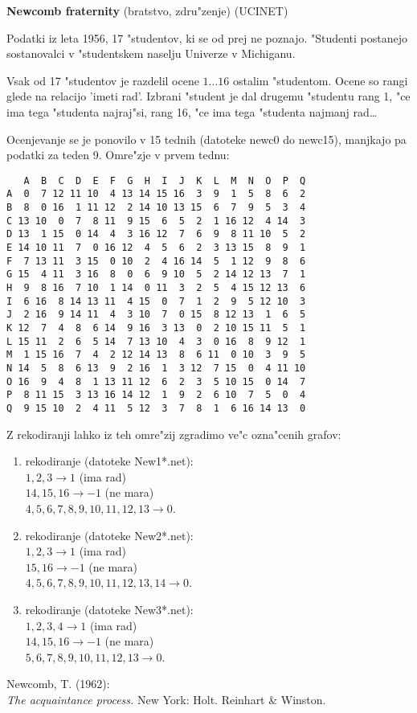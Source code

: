 \documentclass[12pt,a4paper]{article}
\begin{document}
\pagestyle{empty}
{\bf Newcomb fraternity} (bratstvo, zdru"zenje) (UCINET)

Podatki iz leta 1956, 17 "studentov, ki se od prej ne poznajo.
"Studenti postanejo sostanovalci v "studentskem naselju Univerze v 
Michiganu.

Vsak od 17 "studentov je razdelil ocene $1 \ldots 16$ 
ostalim "studentom. Ocene so rangi glede na relacijo 'imeti rad'.
Izbrani "student je dal drugemu "studentu rang 1, 
"ce ima tega "studenta najraj"si, rang 16,
"ce ima tega "studenta  najmanj rad\ldots

Ocenjevanje se je ponovilo v 15 tednih (datoteke newc0 do newc15),
manjkajo pa podatki za teden 9.
Omre"zje v prvem tednu:
\begin{small}
\begin{verbatim}
   A  B  C  D  E  F  G  H  I  J  K  L  M  N  O  P  Q
A  0  7 12 11 10  4 13 14 15 16  3  9  1  5  8  6  2
B  8  0 16  1 11 12  2 14 10 13 15  6  7  9  5  3  4
C 13 10  0  7  8 11  9 15  6  5  2  1 16 12  4 14  3
D 13  1 15  0 14  4  3 16 12  7  6  9  8 11 10  5  2
E 14 10 11  7  0 16 12  4  5  6  2  3 13 15  8  9  1
F  7 13 11  3 15  0 10  2  4 16 14  5  1 12  9  8  6
G 15  4 11  3 16  8  0  6  9 10  5  2 14 12 13  7  1
H  9  8 16  7 10  1 14  0 11  3  2  5  4 15 12 13  6
I  6 16  8 14 13 11  4 15  0  7  1  2  9  5 12 10  3
J  2 16  9 14 11  4  3 10  7  0 15  8 12 13  1  6  5
K 12  7  4  8  6 14  9 16  3 13  0  2 10 15 11  5  1
L 15 11  2  6  5 14  7 13 10  4  3  0 16  8  9 12  1
M  1 15 16  7  4  2 12 14 13  8  6 11  0 10  3  9  5
N 14  5  8  6 13  9  2 16  1  3 12  7 15  0  4 11 10
O 16  9  4  8  1 13 11 12  6  2  3  5 10 15  0 14  7
P  8 11 15  3 13 16 14 12  1  9  2  6 10  7  5  0  4
Q  9 15 10  2  4 11  5 12  3  7  8  1  6 16 14 13  0
\end{verbatim}
\end{small}
Z rekodiranji lahko iz teh omre"zij zgradimo ve"c ozna"cenih grafov:

\begin{enumerate}
\item rekodiranje (datoteke New1*.net):\\
 $1, 2, 3 \to 1$ (ima rad)\\
 $14, 15, 16 \to -1$ (ne mara)\\
 $4, 5, 6, 7, 8, 9, 10, 11, 12, 13 \to 0$.
\item rekodiranje (datoteke New2*.net):\\
 $1, 2, 3 \to 1$ (ima rad)\\
 $15, 16 \to -1$ (ne mara)\\ 
 $4, 5, 6, 7, 8, 9, 10, 11, 12, 13, 14 \to 0$. 
\item rekodiranje (datoteke New3*.net):\\
 $1, 2, 3, 4 \to 1$ (ima rad)\\
 $14, 15, 16 \to -1$ (ne mara)\\
 $5, 6, 7, 8, 9, 10, 11, 12, 13 \to 0$.
 
 
\end{enumerate}   

Newcomb, T. (1962): \\
{\em The acquaintance process.} New York: Holt. Reinhart \& Winston.
\end{document}
